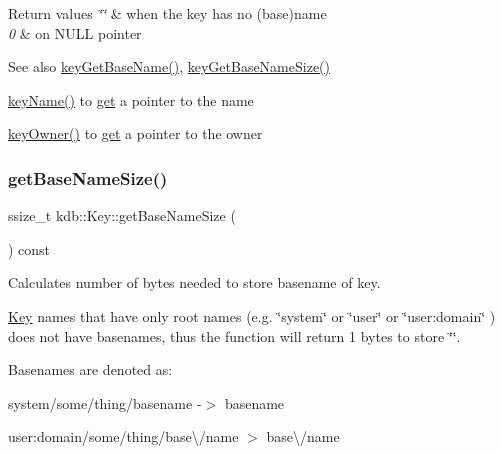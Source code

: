 \begin{DoxyRetVals}{Return values}
{\em \char`\"{}\char`\"{}} & when the key has no (base)name \\
\hline
{\em 0} & on N\+U\+LL pointer \\
\hline
\end{DoxyRetVals}
\begin{DoxySeeAlso}{See also}
\hyperlink{group__keyname_ga0992d26bcfca767cb8e77053a483eb64}{key\+Get\+Base\+Name()}, \hyperlink{group__keyname_ga1a0b76c5d9e5367c7e72211e6c63d43a}{key\+Get\+Base\+Name\+Size()} 

\hyperlink{group__keyname_ga8e805c726a60da921d3736cda7813513}{key\+Name()} to \hyperlink{classkdb_1_1Key_ac558a1f1b2cb50d77fbabcbb24950c05}{get} a pointer to the name 

\hyperlink{owner_8c_af6485fb8599714b6bbd830cf915ffea5}{key\+Owner()} to \hyperlink{classkdb_1_1Key_ac558a1f1b2cb50d77fbabcbb24950c05}{get} a pointer to the owner 
\end{DoxySeeAlso}
\mbox{\label{classkdb_1_1Key_aef3cc0ef1621b91718604e899b43ebc0}} 
\subsubsection{\texorpdfstring{get\+Base\+Name\+Size()}{getBaseNameSize()}}
{\footnotesize\ttfamily ssize\+\_\+t kdb\+::\+Key\+::get\+Base\+Name\+Size (\begin{DoxyParamCaption}{ }\end{DoxyParamCaption}) const\hspace{0.3cm}{\ttfamily [inline]}}



Calculates number of bytes needed to store basename of {\ttfamily key}. 

\hyperlink{classkdb_1_1Key}{Key} names that have only root names (e.\+g. {\ttfamily \char`\"{}system\char`\"{}} or {\ttfamily \char`\"{}user\char`\"{}} or {\ttfamily \char`\"{}user\+:domain\char`\"{}} ) does not have basenames, thus the function will return 1 bytes to store \char`\"{}\char`\"{}.

Basenames are denoted as\+:
\begin{DoxyItemize}
\item {\ttfamily system/some/thing/basename} -\/$>$ {\ttfamily basename} 
\item {\ttfamily user\+:domain/some/thing/base\textbackslash{}/name} $>$ {\ttfamily base\textbackslash{}/name} 
\end{DoxyItemize}


